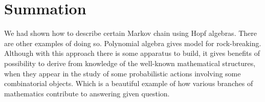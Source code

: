 \documentclass[a4paper, 12pt]{article}
\begin{document}
\section{Summation}
We had shown how to describe certain Markov chain using Hopf algebras. There are other examples of doing so.
Polynomial algebra gives model for rock-breaking. Although with this approach there is some apparatus
to build, it gives benefits of possibility to derive from knowledge of the well-known mathematical
structures, when they appear in the study of some probabilistic actions involving some combinatorial
objects.
Which is a beautiful example of how various branches of mathematics contribute to answering given question.

{}

\end{document}
